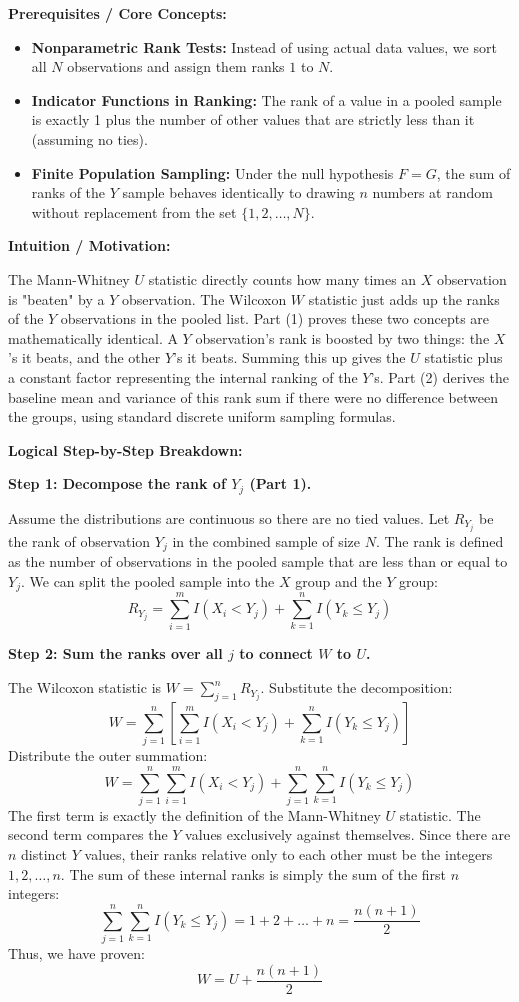 \begin{solution}
\textbf{Prerequisites / Core Concepts:}
\begin{itemize}
    \item \textbf{Nonparametric Rank Tests:} Instead of using actual data values, we sort all $N$ observations and assign them ranks $1$ to $N$.
    \item \textbf{Indicator Functions in Ranking:} The rank of a value in a pooled sample is exactly 1 plus the number of other values that are strictly less than it (assuming no ties).
    \item \textbf{Finite Population Sampling:} Under the null hypothesis $F=G$, the sum of ranks of the $Y$ sample behaves identically to drawing $n$ numbers at random without replacement from the set $\{1, 2, \dots, N\}$.
\end{itemize}

\textbf{Intuition / Motivation:}

The Mann-Whitney $U$ statistic directly counts how many times an $X$ observation is "beaten" by a $Y$ observation. The Wilcoxon $W$ statistic just adds up the ranks of the $Y$ observations in the pooled list.
Part (1) proves these two concepts are mathematically identical. A $Y$ observation's rank is boosted by two things: the $X$'s it beats, and the other $Y$'s it beats. Summing this up gives the $U$ statistic plus a constant factor representing the internal ranking of the $Y$'s.
Part (2) derives the baseline mean and variance of this rank sum if there were no difference between the groups, using standard discrete uniform sampling formulas.

\textbf{Logical Step-by-Step Breakdown:}

\textbf{Step 1: Decompose the rank of $Y_j$ (Part 1).}

Assume the distributions are continuous so there are no tied values.
Let $R_{Y_j}$ be the rank of observation $Y_j$ in the combined sample of size $N$.
The rank is defined as the number of observations in the pooled sample that are less than or equal to $Y_j$.
We can split the pooled sample into the $X$ group and the $Y$ group:
\[ R_{Y_j} = \sum_{i=1}^m I(X_i < Y_j) + \sum_{k=1}^n I(Y_k \leq Y_j) \]

\textbf{Step 2: Sum the ranks over all $j$ to connect $W$ to $U$.}

The Wilcoxon statistic is $W = \sum_{j=1}^n R_{Y_j}$. Substitute the decomposition:
\[ W = \sum_{j=1}^n \left[ \sum_{i=1}^m I(X_i < Y_j) + \sum_{k=1}^n I(Y_k \leq Y_j) \right] \]
Distribute the outer summation:
\[ W = \sum_{j=1}^n \sum_{i=1}^m I(X_i < Y_j) + \sum_{j=1}^n \sum_{k=1}^n I(Y_k \leq Y_j) \]
The first term is exactly the definition of the Mann-Whitney $U$ statistic.
The second term compares the $Y$ values exclusively against themselves. Since there are $n$ distinct $Y$ values, their ranks relative only to each other must be the integers $1, 2, \dots, n$.
The sum of these internal ranks is simply the sum of the first $n$ integers:
\[ \sum_{j=1}^n \sum_{k=1}^n I(Y_k \leq Y_j) = 1 + 2 + \dots + n = \frac{n(n+1)}{2} \]
Thus, we have proven:
\[ W = U + \frac{n(n+1)}{2} \]


\end{solution}
